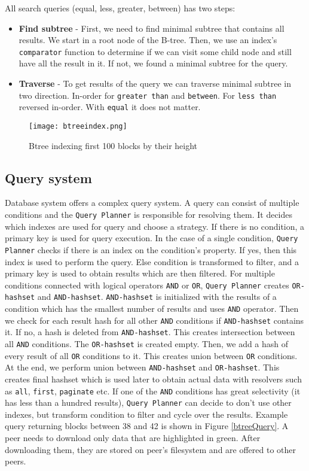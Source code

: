 All search queries (equal, less, greater, between) has two steps:
\begin{itemize}
    \item \textbf{Find subtree} - First, we need to find minimal subtree that contains all results. We start in a root node of the B-tree. Then, we use an index's \texttt{comparator} function to determine if we can visit some child node and still have all the result in it. If not, we found a minimal subtree for the query.
    \item \textbf{Traverse} - To get results of the query we can traverse minimal subtree in two direction. In-order for \texttt{greater than} and \texttt{between}. For \texttt{less than} reversed in-order. With \texttt{equal} it does not matter.
\end{itemize}

\begin{figure}[h]
    \centering
    \texttt{[image: btreeindex.png]}
    \caption{Btree indexing first 100 blocks by their height}
    \label{btree}
\end{figure}

\subsection{Query system}
Database system offers a complex query system. A query can consist of multiple conditions and the \texttt{Query Planner} is responsible for resolving them. It decides which indexes are used for query and choose a strategy. If there is no condition, a primary key is used for query execution. In the case of a single condition, \texttt{Query Planner} checks if there is an index on the condition's property. If yes, then this index is used to perform the query. Else condition is transformed to filter, and a primary key is used to obtain results which are then filtered. For multiple conditions connected with logical operators \texttt{AND} or \texttt{OR}, \texttt{Query Planner} creates \texttt{OR-hashset} and \texttt{AND-hashset}. \texttt{AND-hashset} is initialized with the results of a condition which has the smallest number of results and uses \texttt{AND} operator. Then we check for each result hash for all other \texttt{AND} conditions if \texttt{AND-hashset} contains it. If no, a hash is deleted from \texttt{AND-hashset}. This creates intersection between all \texttt{AND} conditions. The \texttt{OR-hashset} is created empty. Then, we add a hash of every result of all \texttt{OR} conditions to it. This creates union between \texttt{OR} conditions. At the end, we perform union between \texttt{AND-hashset} and \texttt{OR-hashset}. This creates final hashset which is used later to obtain actual data with resolvers such as \texttt{all}, \texttt{first}, \texttt{paginate} etc. If one of the \texttt{AND} conditions has great selectivity (it has less than a hundred results), \texttt{Query Planner} can decide to don't use other indexes, but transform condition to filter and cycle over the results. Example query returning blocks between 38 and 42 is shown in Figure \ref{btreeQuery}. A peer needs to download only data that are highlighted in green. After downloading them, they are stored on peer's filesystem and are offered to other peers. 

